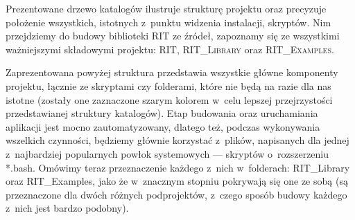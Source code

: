Prezentowane drzewo katalogów ilustruje strukturę projektu oraz precyzuje położenie wszystkich, istotnych z~punktu widzenia instalacji, skryptów. Nim przejdziemy do budowy biblioteki \textsc{RIT} ze źródeł, zapoznamy się ze wszystkimi ważniejszymi składowymi projektu: \textsc{RIT}, \textsc{RIT\_Library} oraz \textsc{RIT\_Examples}.

\small
\noindent{}

Zaprezentowana powyżej struktura przedstawia wszystkie główne komponenty projektu, łącznie ze skryptami czy folderami, które nie będą na razie dla nas istotne (zostały one zaznaczone szarym kolorem w~celu lepszej przejrzystości przedstawianej struktury katalogów). Etap budowania oraz uruchamiania aplikacji jest mocno zautomatyzowany, dlatego też, podczas wykonywania wszelkich czynności, będziemy głównie korzystać z~plików, napisanych dla jednej z~najbardziej popularnych powłok systemowych --- skryptów o~rozszerzeniu \textsf{*.bash}. Omówimy teraz przeznaczenie każdego z~nich w~folderach: \textsf{RIT\_Library} oraz  \textsf{RIT\_Examples}, jako że w~znacznym stopniu pokrywają się one ze sobą (są przeznaczone dla dwóch różnych podprojektów, z~czego sposób budowy każdego z~nich jest bardzo podobny).

